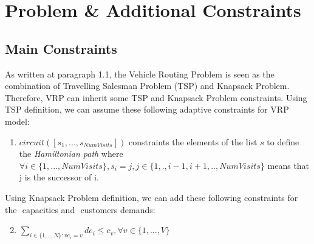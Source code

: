 \section{Problem \& Additional Constraints}
\subsection{Main Constraints}
As written at paragraph 1.1, the Vehicle Routing Problem is seen as the combination of Travelling Salesman Problem (TSP) and Knapsack Problem. Therefore, VRP can inherit some TSP and Knapsack Problem constraints.
\newline
\newline
Using TSP definition, we can assume these following adaptive constraints for VRP model:
\begin{enumerate}
    \item \begin{math}circuit([s_{1},...,s_{NumVisits}])\end{math} constraints the elements of the list \begin{math}s\end{math} to define the \textit{Hamiltonian path} where \begin{math}\forall i \in \{1,...,NumVisits\},s_{i} = j, j \in \{1,., i-1,i+1,..,NumVisits\}\end{math} means that j is the successor of i.
\end{enumerate}
Using Knapsack Problem definition, we can add these following constraints for the \begin{math}[c_{1}, ..., c_{v}]\end{math} capacities and \begin{math}[de_{1}, ..., de_{N}]\end{math} customers demands:

\begin{enumerate}
 \setcounter{enumi}{1}
    \item \begin{math} \sum_{i \in \{1,..,N\} : ve_{i} = v}de_{i} \leq c_{v}, \forall v \in \{1,..., V\}\end{math}
\end{enumerate}

